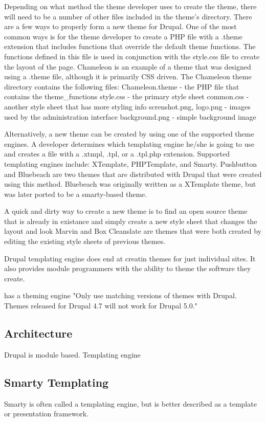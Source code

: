 \documentclass[a4paper,12pt]{report}
\begin{document}
Depending on what method the theme developer uses to create the theme, there will need to be a number of other files included in the theme's directory. 
There are a few ways to properly form a new theme for Drupal. 
One of the most common ways is for the theme developer to create a PHP file with a .theme extension that includes functions that override the default theme functions. 
The functions defined in this file is used in conjunction with the style.css file to create the layout of the page. 
Chameleon is an example of a theme that was designed using a .theme file, although it is primarily CSS driven. 
The Chameleon theme directory contains the following files: 
Chameleon.theme - the PHP file that contains the theme_functions 
style.css - the primary style sheet
common.css -  another style sheet that has more styling info
screnshot.png, logo.png - images used by the administration interface
background.png - simple background image


Alternatively, a new theme can be created by using one of the supported theme engines. A developer determines which templating engine he/she is going to use and creates a file with a .xtmpl, .tpl, or a .tpl.php extension. 
Supported templating engines include: XTemplate, PHPTemplate, and Smarty. 
Pushbutton and Bluebeach are two themes that are distributed with Drupal that were created using this method. 
Bluebeach was originally written as a XTemplate theme, but was later ported to be a smarty-based theme. 

A quick and dirty way to create a new theme is to find an open source theme that is already in existance and simply create a new style sheet that changes the layout and look 
Marvin and Box Cleanslate are themes that were both created by editing the existing style sheets of previous themes. 


Drupal templating engine does end at creatin themes for just individual sites. 
It also provides module programmers with the ability to theme the software they create. 

has a theming engine "Only use matching versions of themes with Drupal. Themes released for Drupal 4.7 will not work for Drupal 5.0."


\subsection {Architecture}
Drupal is module based. Templating engine

\subsection{Smarty Templating}
Smarty is often called a templating engine, but is better described as a template or presentation framework.
\end{document}
